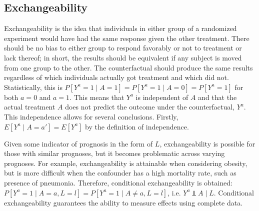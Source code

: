 \subsection{Exchangeability} \label{exchangeability} 
Exchangeability is the idea that individuals in either group of a randomized experiment would have had the same response given the other treatment. \cite{hernan_robins_2016}  There should be no bias to either group to respond favorably or not to treatment or lack thereof; in short, the results should be equivalent if any subject is moved from one group to the other.  The counterfactual should produce the same results regardless of which individuals actually got treatment and which did not.  Statistically, this is $P[Y^a = 1 \mid A = 1] = P[Y^a = 1 \mid A = 0] = P[Y^a = 1]$ for both $a=0$ and $a=1$.  This means that $Y^a$ is independent of $A$ and that the actual treatment $A$ does not predict the outcome under the counterfactual, $Y^a$.  This independence allows for several conclusions.  Firstly, $E[Y^a \mid A = a'] = E[Y^a]$ by the definition of independence.  

Given some indicator of prognosis in the form of $L$, exchangeability is possible for those with similar prognoses, but it becomes problematic across varying prognoses.  For example, exchangeability is attainable when considering obesity, but is more difficult when the confounder has a high mortality rate, such as presence of pneumonia.  Therefore, conditional exchangeability is obtained: $P[Y^a = 1 \mid A = a, L=l] = P[Y^a = 1 \mid A \neq a, L=l]$, i.e. $Y^{a} \Perp A\mid L$. \cite{hernan_robins_2016}  Conditional exchangeability guarantees the ability to measure effects using complete data.  

